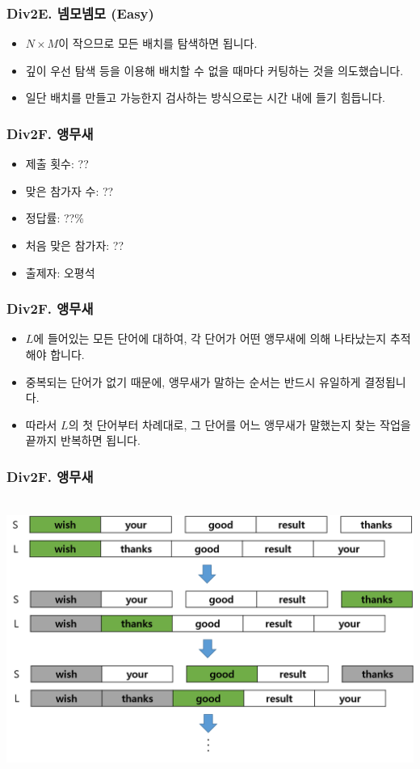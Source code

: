 \documentclass[xetex]{beamer}
\begin{document}
\begin{frame}
  \frametitle{Div2E. 넴모넴모 (Easy)}
  \begin{itemize}
    \item $N \times M$이 작으므로 모든 배치를 탐색하면 됩니다.
    \item 깊이 우선 탐색 등을 이용해 배치할 수 없을 때마다 커팅하는 것을 의도했습니다.
    \item 일단 배치를 만들고 가능한지 검사하는 방식으로는 시간 내에 들기 힘듭니다.
  \end{itemize}
\end{frame}

\begin{frame}
  \frametitle{Div2F. 앵무새}
  \begin{itemize}
    \item 제출 횟수: ??
    \item 맞은 참가자 수: ??
    \item 정답률: ??\%
    \item 처음 맞은 참가자: ??
    \item 출제자: 오평석
  \end{itemize}
\end{frame}

\begin{frame}
  \frametitle{Div2F. 앵무새}
  \begin{itemize}
    \item $L$에 들어있는 모든 단어에 대하여, 각 단어가 어떤 앵무새에 의해 나타났는지 추적해야 합니다.
    \item 중복되는 단어가 없기 때문에, 앵무새가 말하는 순서는 반드시 유일하게 결정됩니다.
    \item 따라서 $L$의 첫 단어부터 차례대로, 그 단어를 어느 앵무새가 말했는지 찾는 작업을 끝까지 반복하면 됩니다.
  \end{itemize}
\end{frame}

\begin{frame}
  \frametitle{Div2F. 앵무새}
  \begin{center}
    \includegraphics[width=1\textwidth]{parrot-sol.png}
  \end{center}
\end{frame}
\end{document}
